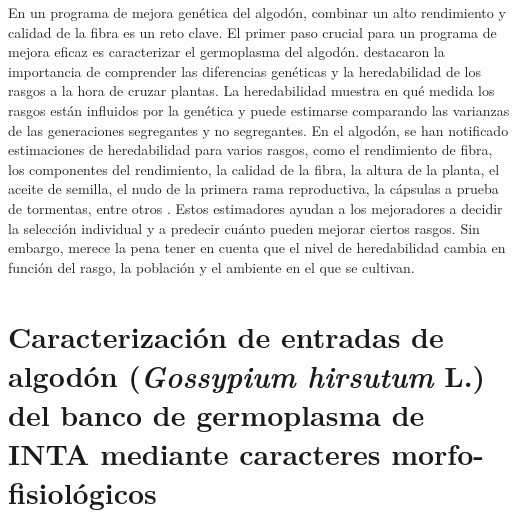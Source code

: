 \documentclass[12pt,oneside]{reedthesis}
\begin{document}
En un programa de mejora genética del algodón, combinar un alto rendimiento y calidad de la fibra es un reto clave. El primer paso crucial para un programa de mejora eficaz es caracterizar el germoplasma del algodón. \textcite{kearsey1996} destacaron la importancia de comprender las diferencias genéticas y la heredabilidad de los rasgos a la hora de cruzar plantas. La heredabilidad muestra en qué medida los rasgos están influidos por la genética y puede estimarse comparando las varianzas de las generaciones segregantes y no segregantes. En el algodón, se han notificado estimaciones de heredabilidad para varios rasgos, como el rendimiento de fibra, los componentes del rendimiento, la calidad de la fibra, la altura de la planta, el aceite de semilla, el nudo de la primera rama reproductiva, la cápsulas a prueba de tormentas, entre otros \autocite{meredith1984,tang1996,ribeiro2017,decarvalho2022,nidagundi2023}. Estos estimadores ayudan a los mejoradores a decidir la selección individual y a predecir cuánto pueden mejorar ciertos rasgos. Sin embargo, merece la pena tener en cuenta que el nivel de heredabilidad cambia en función del rasgo, la población y el ambiente en el que se cultivan.



















































\chapter{\texorpdfstring{Caracterización de entradas de algodón (\emph{Gossypium hirsutum} L.) del banco de germoplasma de INTA mediante caracteres morfo-fisiológicos}{Caracterización de entradas de algodón (Gossypium hirsutum L.) del banco de germoplasma de INTA mediante caracteres morfo-fisiológicos}}\label{rmd-basics}
\end{document}
